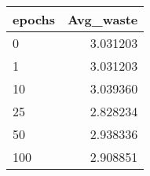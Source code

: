 \begin{tabular}{lr}
\toprule
epochs &  Avg\_waste \\
\midrule
     0 &   3.031203 \\
     1 &   3.031203 \\
    10 &   3.039360 \\
    25 &   2.828234 \\
    50 &   2.938336 \\
   100 &   2.908851 \\
\bottomrule
\end{tabular}
